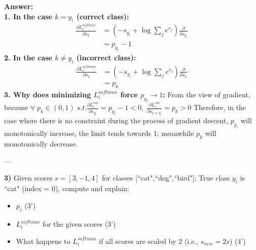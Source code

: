 \documentclass[12pt,a4paper]{article}
\begin{document}
	\textbf{Answer:}\\
	\textbf{1. In the case $k = y_i$ (correct class):}
	\begin{align}
		\frac{\partial L_i^{softmax}}{\partial s_k}&=(-s_{y_i}+\log \sum_j e^{s_j})\frac{\partial}{\partial s_{y_i}}
		\\
		&=p_{y_i}-1
	\end{align}
	\textbf{2. In the case $k \ne y_i$ (incorrect class):}
	\begin{align}
		\frac{\partial L_i^{softmax}}{\partial s_k}&=(-s_{y_i}+\log \sum_j e^{s_j})\frac{\partial}{\partial s_{k}}
		\\
		&=p_{k}
	\end{align}
	\textbf{3. Why does minimizing $L_i^{softmax}$ force $p_{y_i}\rightarrow 1$:} From the view of gradient, because $\forall \; p_k\in(0,1)\; s.t. \frac{\partial L_i^{sm}}{\partial s_{y_i}}=p_{y_i}-1<0,\; \frac{\partial L_i^{sm}}{\partial s_{k\ne y_i}}=p_{k}>0$ Therefore, in the case where there is no constraint during the process of gradient descent, $p_{y_i}$ will monotonically increase, the limit tends towards 1; meanwhile $p_{k}$ will monotonically decrease.
	
	---
	
	\textbf{3)}  
	Given scores $s = [3,-1,4]$ for classes [``cat",``dog",``bird"]; True class $y_i$ is ``cat" (index = 0), compute and explain:
	\begin{itemize}[itemsep=0pt, topsep=0pt, parsep=0pt, partopsep=0pt]
		\item $p_j$ (3’)
		\item $L_i^{softmax}$ for the given scores (3’)
		\item What happens to $L_i^{softmax}$ if all scores are scaled by 2 (i.e., $s_{new}=2s$) (4’)
	\end{itemize}
	
\end{document}
